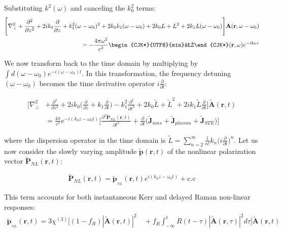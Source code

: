 \documentclass[11pt,a4paper]{article}
\newcommand{\kii}{\text{\begin{CJK*}{UTF8}{min}力\end{CJK*}}}
\begin{document}
Substituting $k^2(\omega)$ and canceling the $k_0^2$ terms:
\begin{equation*}
\begin{split}
\Bigg[\nabla_\perp^2+ \frac{\partial^2 }{\partial z^2} + 2ik_0 \frac{\partial}{\partial z} +  k_1^2(\omega - \omega_0)^2 + 2k_0k_1(\omega-\omega_0)
+ 2k_0L + L^2 + 2k_1L(\omega-\omega_0)\Bigg] \mathbf{A}(\mathbf{r},\omega-\omega_0)\\ = -\frac{4\pi \omega^2}{c^2} \kii(\mathbf{r},\omega) e^{-ik_0z}
\end{split}
\end{equation*}

We now transform back to the time domain by multiplying by $\int d(\omega-\omega_0)e^{-i(\omega-\omega_0)t}$. In this transformation, the frequency detuning $(\omega-\omega_0)$ becomes the time derivative operator $i\frac{\partial}{\partial t}$:

\begin{equation*}
\begin{split}
\Bigg[\nabla_\perp^2 &+ \frac{\partial^2 }{\partial z^2} + 2ik_0 \bigg(\frac{\partial}{\partial z}+k_1\frac{\partial}{\partial t}\bigg) -  k_1^2\frac{\partial^2}{\partial t^2}  + 2k_0\tilde{L} + \tilde{L}^2 +2ik_1\tilde{L}\frac{\partial}{\partial t}\Bigg] \tilde{\mathbf{A}}(\mathbf{r},t) \\
&= \frac{4\pi}{c^2}e^{-i(k_0z-\omega_0t)}\Bigg[\frac{\partial^2\tilde{\mathbf{P}}_{NL}(\mathbf{r},t)}{\partial t ^2} +\frac{\partial }{\partial t}\big(\tilde{\mathbf{J}}_{ions}+\tilde{\mathbf{J}}_{plasma}+\tilde{\mathbf{J}}_{STE}\big)\Bigg]
\end{split}
\end{equation*}

where the dispersion operator in the time domain is $\tilde{L} = \sum^{\infty}_{n=2}\frac{1}{n!}k_n\big(i\frac{\partial}{\partial t}\big)^n$.
\newline
Let us now consider the slowly varying amplitude $\tilde{\mathbf{p}}(\mathbf{r},t)$ of the nonlinear polarization vector $\tilde{\mathbf{P}}_{NL}(\mathbf{r},t)$: 

\begin{equation*}
\tilde{\mathbf{P}}_{NL}(\mathbf{r},t) =\tilde{\mathbf{p}}_{_{NL}}(\mathbf{r},t)e^{i(k_0z-\omega_0t)} +\text{c.c}
\end{equation*}

This term accounts for both instantaneous Kerr and delayed Raman non-linear responses:
\begin{equation*}
\begin{split}
\tilde{\mathbf{p}}_{_{NL}}(\mathbf{r},t) = 3 \chi^{(3)}\Bigg[(1-f_R)|\tilde{\mathbf{A}}(\mathbf{r},t)|^2 \quad + f_R\int_{-\infty}^tR(t-\tau) |\tilde{\mathbf{A}}(\mathbf{r},\tau)|^2 d\tau \Bigg]\tilde{\mathbf{A}}(\mathbf{r},t)
\end{split}
\end{equation*}
\end{document}
